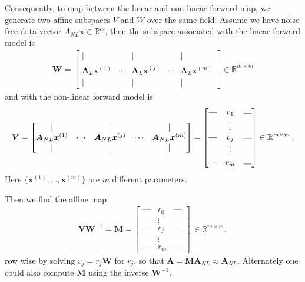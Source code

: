 Consequently, to map between the linear and non-linear forward map, we generate two affine subspaces $V$ and $W$ over the same field.
Assume we have noise free data vector $A_{NL}\bm{x} \in \mathbb{R}^m$, then the subspace associated with the linear forward model is \begin{align}
	\bm{W} = \begin{bmatrix}
		\vert&   &  \vert & & \vert \\
		\bm{A}_{L} \bm{x}^{(1)} &  \cdots& \bm{A}_{L} \bm{x}^{(j)} &  \cdots & \bm{A}_{L} \bm{x}^{(m)} \\
		\vert&   &  \vert & & \vert 
	\end{bmatrix}\in \mathbb{R}^{m \times m}
\end{align} and with the non-linear forward model is 
\begin{align}
	\bm{V} = \begin{bmatrix}
		\vert&   &  \vert & & \vert \\
		\bm{A}_{NL}\bm{x}^{(1)} &  \cdots& \bm{A}_{NL}\bm{x}^{(j)} &  \cdots & \bm{A}_{NL} \bm{x}^{(m)}  \\
		\vert&   &  \vert & & \vert 
	\end{bmatrix} = 
	\begin{bmatrix}
		\rule[.5ex]{1em}{0.4pt} & v_1 &	\rule[.25ex]{1em}{0.4pt}\\
		&\vdots  & \\
		\rule[.5ex]{1em}{0.4pt} &v_j &	\rule[.25ex]{1em}{0.4pt}\\
		&\vdots  & \\
		\rule[.5ex]{1em}{0.4pt}& v_m&	\rule[.25ex]{1em}{0.4pt}
	\end{bmatrix} \in \mathbb{R}^{m \times m} \, ,
\end{align}
Here $\big\{  \bm{x}^{(1)} , \dots, \bm{x}^{(m)} \big\}$ are $m$ different parameters.

Then we find the affine map 
\begin{align}
	\bm{V}\bm{W}^{-1} = \bm{M} = \begin{bmatrix}
		\text{---} & r_0 &   \text{---}  \\
		&  \vdots  & \\
		\text{---}& r_j &  \text{---} \\
		&  \vdots  & \\
		\text{---} & r_m &   \text{---}
	\end{bmatrix} \, \in \mathbb{R}^{m \times m} ,
\end{align}
row wise by solving $v_j = r_j \bm{W}$ for $ r_j $, so that $ \bm{A} = \bm{M} \bm{A}_{NL} \approx \bm{A}_{NL} $.
Alternately one could also compute $\bm{M}$ using the inverse $\bm{W}^{-1}$.

